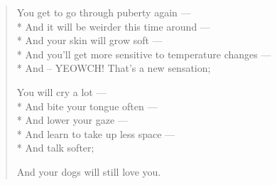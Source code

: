 \begin{verse}
  You get to go through puberty again ---\\*
  \vin And it will be weirder this time around ---\\*
  \vin And your skin will grow soft ---\\*
  \vin And you'll get more sensitive to temperature changes ---\\*
  \vin And -- YEOWCH! That's a new sensation;

  You will cry a lot ---\\*
  \vin And bite your tongue often ---\\*
  \vin And lower your gaze ---\\*
  \vin And learn to take up less space ---\\*
  \vin And talk softer;

  And your dogs will still love you.
\end{verse}
